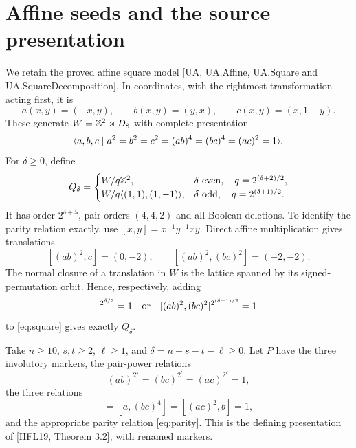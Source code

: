 \section{Affine seeds and the source presentation}
We retain the proved affine square model [UA, UA.Affine, UA.Square and
UA.SquareDecomposition]. In coordinates, with the rightmost transformation
acting first, it is
\[
 a(x,y)=(-x,y),\qquad b(x,y)=(y,x),\qquad c(x,y)=(x,1-y).
\]
These generate $W=\mathbb Z^2\rtimes D_8$ with complete presentation
\begin{equation}
 \langle a,b,c\mid a^2=b^2=c^2=(ab)^4=(bc)^4=(ac)^2=1\rangle.           \label{eq:square}
\end{equation}
For $\delta\geq0$, define
\[
 Q_\delta=\begin{cases}
 W/q\mathbb Z^2,&\delta\text{ even},\quad q=2^{(\delta+2)/2},\\
 W/q\langle (1,1),(1,-1)\rangle,&\delta\text{ odd},\quad q=2^{(\delta+1)/2}.
 \end{cases}
\]
It has order $2^{\delta+5}$, pair orders $(4,4,2)$ and all Boolean deletions.
To identify the parity relation exactly, use $[x,y]=x^{-1}y^{-1}xy$.
Direct affine multiplication gives translations
\[
 [(ab)^2,c]=(0,-2),\qquad [(ab)^2,(bc)^2]=(-2,-2).
\]
The normal closure of a translation in $W$ is the lattice spanned by its
signed-permutation orbit. Hence, respectively, adding
\begin{equation}
 [(ab)^2,c]^{2^{\delta/2}}=1\quad\hbox{or}\quad
 [(ab)^2,(bc)^2]^{2^{(\delta-1)/2}}=1                          \label{eq:parity}
\end{equation}
to \eqref{eq:square} gives exactly $Q_\delta$.

Take $n\geq10$, $s,t\geq2$, $\ell\geq1$, and
$\delta=n-s-t-\ell\geq0$. Let $P$ have the three involutory markers,
the pair-power relations
\[
 (ab)^{2^s}=(bc)^{2^t}=(ac)^{2^\ell}=1,
\]
the three relations
\begin{equation}
 [(ab)^4,c]=[a,(bc)^4]=[(ac)^2,b]=1,                           \label{eq:normal}
\end{equation}
and the appropriate parity relation \eqref{eq:parity}. This is the defining
presentation of [HFL19, Theorem 3.2], with renamed markers.

